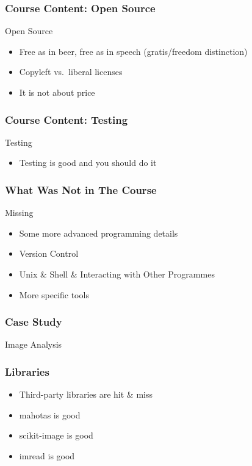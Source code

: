 \begin{frame}[fragile]
\frametitle{Course Content: Open Source}
\begin{block}{Open Source}
\begin{itemize}
\item Free as in beer, free as in speech (gratis/freedom distinction)
\item Copyleft vs.\ liberal licenses
\item It is not about price
\end{itemize}
\end{block}
\end{frame}

\begin{frame}[fragile]
\frametitle{Course Content: Testing}
\begin{block}{Testing}
\begin{itemize}
\item Testing is good and you should do it
\end{itemize}
\end{block}
\end{frame}

\begin{frame}[fragile]
\frametitle{What Was Not in The Course}
\begin{block}{Missing}
\begin{itemize}
\item Some more advanced programming details
\item Version Control
\item Unix \& Shell \& Interacting with Other Programmes
\item More specific tools
\end{itemize}
\end{block}

\end{frame}


\begin{frame}[fragile]
\frametitle{Case Study}

\bigskip
\bigskip
\bigskip
Image Analysis

\end{frame}


\begin{frame}[fragile]
\frametitle{Libraries}

\begin{itemize}
\item Third-party libraries are hit \& miss
\item mahotas is good
\item scikit-image is good
\item imread is good
\end{itemize}

\end{frame}

